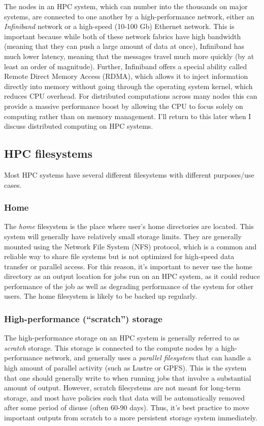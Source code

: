 The nodes in an HPC system, which can number into the thousands on major systems, are connected to one another by a high-performance network, either an \textit{Infiniband} network or a high-speed (10-100 Gb) Ethernet network. This is important because while both of these network fabrics have high bandwidth (meaning that they can push a large amount of data at once), Infiniband has much lower latency, meaning that the messages travel much more quickly (by at least an order of magnitude).  Further, Infiniband offers a special ability called Remote Direct Memory Access (RDMA), which allows it to inject information directly into memory without going through the operating system kernel, which reduces CPU overhead. For distributed computations across many nodes this can provide a massive performance boost by allowing the CPU to focus solely on computing rather than on memory management.  I'll return to this later when I discuss distributed computing on HPC systems.

\subsection{HPC filesystems}

Most HPC systems have several different filesystems with different purposes/use cases.

\subsubsection{Home}

The \textit{home} filesystem is the place where user's home directories are located.  This system will generally have relatively small storage limits.  They are generally mounted using the Network File System (NFS) protocol, which is a common and reliable way to share file systems but is not optimized for high-speed data transfer or parallel access.  For this reason, it's important to never use the home directory as an output location for jobs run on an HPC system, as it could reduce performance of the job as well as degrading performance of the system for other users.  The home filesystem is likely to be backed up regularly.

\subsubsection{High-performance (``scratch'') storage}

The high-performance storage on an HPC system is generally referred to as \textit{scratch} storage.  This storage is connected to the compute nodes by a high-performance network, and generally uses a \textit{parallel filesystem} that can handle a high amount of parallel activity (such as Lustre or GPFS).  This is the system that one should generally write to when running jobs that involve a substantial amount of output. However, scratch filesystems are not meant for long-term storage, and most have policies such that data will be automatically removed after some period of disuse (often 60-90 days). Thus, it's best practice to move important outputs from scratch to a more persistent storage system immediately.

